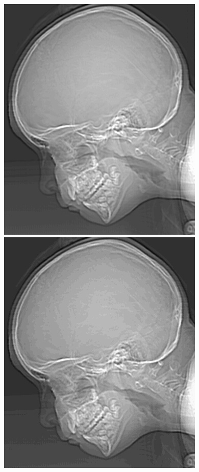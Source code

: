 \documentclass[notheorems,serif,table,compress]{beamer}  %
\begin{document}
\begin{frame}
\begin{figure}
\begin{minipage}[t]{0.4\linewidth}
        \end{minipage}
        \begin{minipage}[t]{0.4\linewidth}
        \centering
        \includegraphics[width=0.8\linewidth]{k=6.jpg} 
        \end{minipage}
        \begin{minipage}[t]{0.4\linewidth}
        \centering
        \includegraphics[width=0.8\linewidth]{k=5.jpg} 
        \end{minipage}
       
\end{figure}
\end{frame}
\end{document}
